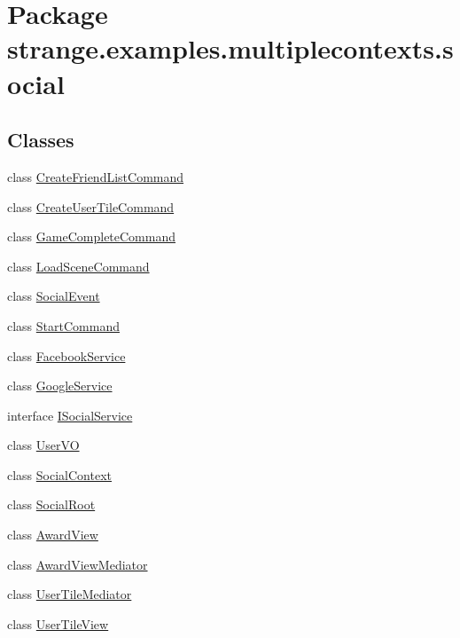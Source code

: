 \hypertarget{namespacestrange_1_1examples_1_1multiplecontexts_1_1social}{\section{Package strange.\-examples.\-multiplecontexts.\-social}
\label{namespacestrange_1_1examples_1_1multiplecontexts_1_1social}
}
\subsection*{Classes}
\begin{DoxyCompactItemize}
\item 
class \hyperlink{classstrange_1_1examples_1_1multiplecontexts_1_1social_1_1_create_friend_list_command}{Create\-Friend\-List\-Command}
\item 
class \hyperlink{classstrange_1_1examples_1_1multiplecontexts_1_1social_1_1_create_user_tile_command}{Create\-User\-Tile\-Command}
\item 
class \hyperlink{classstrange_1_1examples_1_1multiplecontexts_1_1social_1_1_game_complete_command}{Game\-Complete\-Command}
\item 
class \hyperlink{classstrange_1_1examples_1_1multiplecontexts_1_1social_1_1_load_scene_command}{Load\-Scene\-Command}
\item 
class \hyperlink{classstrange_1_1examples_1_1multiplecontexts_1_1social_1_1_social_event}{Social\-Event}
\item 
class \hyperlink{classstrange_1_1examples_1_1multiplecontexts_1_1social_1_1_start_command}{Start\-Command}
\item 
class \hyperlink{classstrange_1_1examples_1_1multiplecontexts_1_1social_1_1_facebook_service}{Facebook\-Service}
\item 
class \hyperlink{classstrange_1_1examples_1_1multiplecontexts_1_1social_1_1_google_service}{Google\-Service}
\item 
interface \hyperlink{interfacestrange_1_1examples_1_1multiplecontexts_1_1social_1_1_i_social_service}{I\-Social\-Service}
\item 
class \hyperlink{classstrange_1_1examples_1_1multiplecontexts_1_1social_1_1_user_v_o}{User\-V\-O}
\item 
class \hyperlink{classstrange_1_1examples_1_1multiplecontexts_1_1social_1_1_social_context}{Social\-Context}
\item 
class \hyperlink{classstrange_1_1examples_1_1multiplecontexts_1_1social_1_1_social_root}{Social\-Root}
\item 
class \hyperlink{classstrange_1_1examples_1_1multiplecontexts_1_1social_1_1_award_view}{Award\-View}
\item 
class \hyperlink{classstrange_1_1examples_1_1multiplecontexts_1_1social_1_1_award_view_mediator}{Award\-View\-Mediator}
\item 
class \hyperlink{classstrange_1_1examples_1_1multiplecontexts_1_1social_1_1_user_tile_mediator}{User\-Tile\-Mediator}
\item 
class \hyperlink{classstrange_1_1examples_1_1multiplecontexts_1_1social_1_1_user_tile_view}{User\-Tile\-View}
\end{DoxyCompactItemize}
